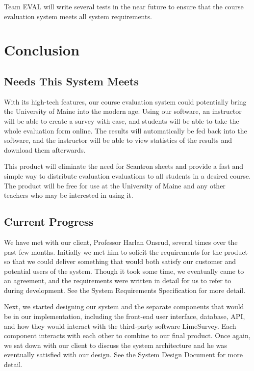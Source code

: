 \documentclass{article}
\begin{document}
Team EVAL will write several tests in the near future to ensure that the course evaluation system meets all system requirements.

\newpage

\section{Conclusion}

\subsection{Needs This System Meets}

With its high-tech features, our course evaluation system could potentially bring the University of Maine into the modern age. Using our software, an instructor will be able to create a survey with ease, and students will be able to take the whole evaluation form online. The results will automatically be fed back into the software, and the instructor will be able to view statistics of the results and download them afterwards.

This product will eliminate the need for Scantron sheets and provide a fast and simple way to distribute evaluation evaluations to all students in a desired course. The product will be free for use at the University of Maine and any other teachers who may be interested in using it.

\subsection{Current Progress}

We have met with our client, Professor Harlan Onsrud, several times over the past few months. Initially we met him to solicit the requirements for the product so that we could deliver something that would both satisfy our customer and potential users of the system. Though it took some time, we eventually came to an agreement, and the requirements were written in detail for us to refer to during development. See the System Requirements Specification for more detail.
	
Next, we started designing our system and the separate components that would be in our implementation, including the front-end user interface, database, API, and how they would interact with the third-party software LimeSurvey. Each component interacts with each other to combine to our final product. Once again, we sat down with our client to discuss the system architecture and he was eventually satisfied with our design. See the System Design Document for more detail.
\end{document}
